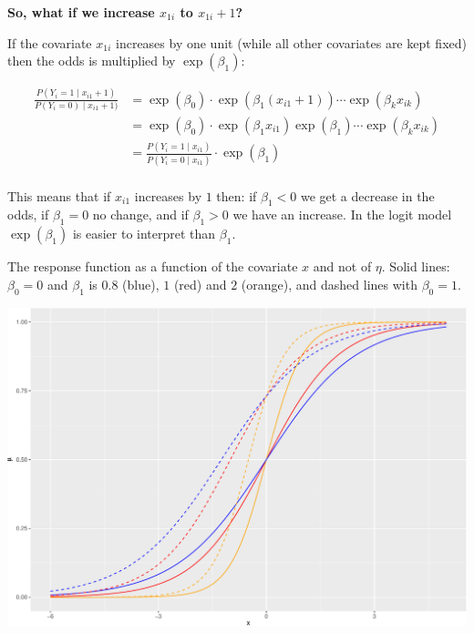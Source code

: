 \documentclass[
  ignorenonframetext,
]{beamer}
\begin{document}
\begin{frame}

\textbf{So, what if we increase \(x_{1i}\) to \(x_{1i}+1\)?}

If the covariate \(x_{1i}\) increases by one unit (while all other
covariates are kept fixed) then the odds is multiplied by
\(\exp(\beta_1)\):

\begin{align*}
\frac{P(Y_i=1\mid x_{i1}+1)}{P(Y_i=0)\mid x_{i1}+1)}&=\exp(\beta_0)\cdot \exp(\beta_1 (x_{i1}+1))\cdots\exp(\beta_k x_{ik})\\
&=\exp(\beta_0)\cdot \exp(\beta_1 x_{i1})\exp(\beta_1)\cdots\exp(\beta_k x_{ik})\\
&=\frac{P(Y_i=1\mid x_{i1})}{P(Y_i=0\mid x_{i1})}\cdot \exp(\beta_1)\\
\end{align*}

This means that if \(x_{i1}\) increases by \(1\) then: if \(\beta_1<0\)
we get a decrease in the odds, if \(\beta_1=0\) no change, and if
\(\beta_1>0\) we have an increase. In the logit model \(\exp(\beta_1)\)
is easier to interpret than \(\beta_1\).

\end{frame}

\begin{frame}

The response function as a function of the covariate \(x\) and not of
\(\eta\). Solid lines: \(\beta_0=0\) and \(\beta_1\) is \(0.8\) (blue),
\(1\) (red) and \(2\) (orange), and dashed lines with \(\beta_0=1\).

\includegraphics{L3_files/figure-beamer/unnamed-chunk-2-1.pdf}

\end{frame}
\end{document}

